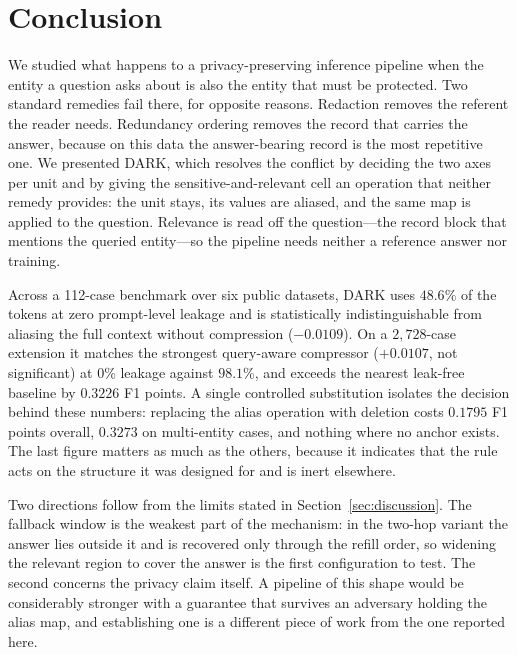 \section{Conclusion}
\label{sec:conclusion}

We studied what happens to a privacy-preserving inference pipeline when the entity a
question asks about is also the entity that must be protected. Two standard remedies fail
there, for opposite reasons. Redaction removes the referent the reader needs. Redundancy
ordering removes the record that carries the answer, because on this data the answer-bearing
record is the most repetitive one. We presented \textsc{DARK}, which resolves the conflict
by deciding the two axes per unit and by giving the sensitive-and-relevant cell an operation
that neither remedy provides: the unit stays, its values are aliased, and the same map is
applied to the question. Relevance is read off the question---the record block that mentions
the queried entity---so the pipeline needs neither a reference answer nor training.

Across a 112-case benchmark over six public datasets, \textsc{DARK} uses $48.6\%$ of the
tokens at zero prompt-level leakage and is statistically indistinguishable from aliasing the
full context without compression ($-0.0109$). On a $2{,}728$-case extension it matches the
strongest query-aware compressor ($+0.0107$, not significant) at $0\%$ leakage against
$98.1\%$, and exceeds the nearest leak-free baseline by $0.3226$ F1 points. A single
controlled substitution isolates the decision behind these numbers: replacing the alias
operation with deletion costs $0.1795$ F1 points overall, $0.3273$ on multi-entity cases, and
nothing where no anchor exists. The last figure matters as much as the others, because it
indicates that the rule acts on the structure it was designed for and is inert elsewhere.

Two directions follow from the limits stated in Section~\ref{sec:discussion}. The fallback
window is the weakest part of the mechanism: in the two-hop variant the answer lies outside
it and is recovered only through the refill order, so widening the relevant region to cover
the answer is the first configuration to test. The second concerns the privacy claim itself.
A pipeline of this shape would be considerably stronger with a guarantee that survives an
adversary holding the alias map, and establishing one is a different piece of work from the
one reported here.

